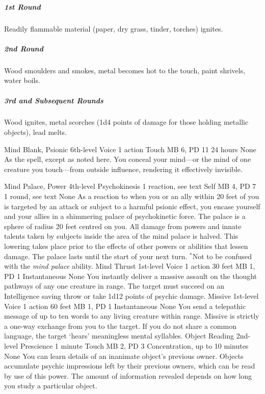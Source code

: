 \subparagraph{1st Round}
  Readily flammable material
  (paper, dry grass, tinder, torches) ignites.
\subparagraph{2nd Round}
  Wood smoulders and smokes,
  metal becomes hot to the touch,
  paint shrivels, water boils.
\subparagraph{3rd and Subsequent Rounds}
  Wood ignites, metal scorches
  (1d4 points of damage for those holding metallic objects),
  lead melts.

\DndPowerHeader%
    {Mind Blank, Psionic\label{pwr:mind_blank_psionic}}
    {6th-level Voice}
    {1 action}
    {Touch}
    {MB 6, PD 11}
    {24 hours}
    {None}
As the  spell, except as
noted here. You conceal your mind---or the mind of one creature
you touch---from outside influence, rendering it effectively
invisible.

\DndPowerHeader%
    {Mind Palace, Power\label{pwr:mind_palace_power}}
    {4th-level Psychokinesis}
    {1 reaction, see text}
    {Self}
    {MB 4, PD 7}
    {1 round, see text}
    {None}
As a reaction to when you or an ally within
20 feet of you is targeted by an attack or subject to a harmful
psionic effect, you encase yourself and your allies in a shimmering
palace of psychokinetic force. The palace is a sphere of radius
20 feet centred on you. All damage from powers and innate
talents taken by subjects inside the area of the mind palace
is halved. This lowering takes place prior to the effects
of other powers or abilities that lessen damage. The palace
lasts until the start of your next turn. $^*$Not to be confused
with the \emph{mind palace} ability.
\DndPowerHeader%
    {Mind Thrust\label{pwr:mind_thrust}}
    {1st-level Voice}
    {1 action}
    {30 feet}
    {MB 1, PD 1}
    {Instantaneous}
    {None}
You instantly deliver a massive assault on
the thought pathways of any one creature in range. The target
must succeed on an Intelligence saving throw or take 1d12
points of psychic damage.
\DndPowerHeader%
    {Missive\label{pwr:missive}}
    {1st-level Voice}
    {1 action}
    {60 feet}
    {MB 1, PD 1}
    {Instantaneous}
    {None}
You send a telepathic message of up to ten
words to any living creature within range. Missive is strictly
a one-way exchange from you to the target. If you do not share
a common language, the target `hears' meaningless mental
syllables.
\DndPowerHeader%
    {Object Reading\label{pwr:object_reading}}
    {2nd-level Prescience}
    {1 minute}
    {Touch}
    {MB 2, PD 3}
    {Concentration, up to 10 minutes}
    {None}
You can learn details of an inanimate object's
previous owner.
Objects accumulate psychic impressions
left by their previous owners,
which can be read by use of this power.
The amount of information revealed depends
on how long you study a particular object.

